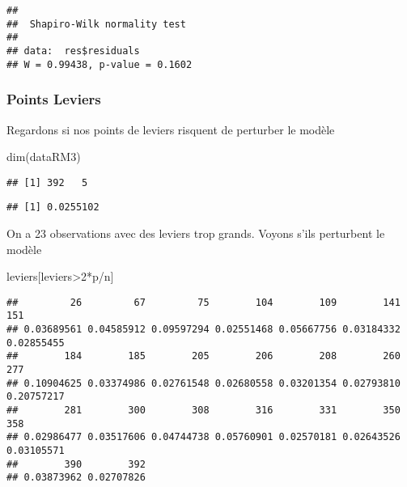 \documentclass[
]{article}
\newenvironment{Shaded}{\begin{snugshade}}{\end{snugshade}}
\newcommand{\DecValTok}[1]{\textcolor[rgb]{0.00,0.00,0.81}{#1}}
\newcommand{\FunctionTok}[1]{\textcolor[rgb]{0.00,0.00,0.00}{#1}}
\newcommand{\NormalTok}[1]{#1}
\newcommand{\OtherTok}[1]{\textcolor[rgb]{0.56,0.35,0.01}{#1}}
\newcommand{\SpecialCharTok}[1]{\textcolor[rgb]{0.00,0.00,0.00}{#1}}
\newcommand{\StringTok}[1]{\textcolor[rgb]{0.31,0.60,0.02}{#1}}
\begin{document}
\begin{verbatim}
## 
##  Shapiro-Wilk normality test
## 
## data:  res$residuals
## W = 0.99438, p-value = 0.1602
\end{verbatim}

\hypertarget{points-leviers}{%
\subsubsection{Points Leviers}\label{points-leviers}}

Regardons si nos points de leviers risquent de perturber le modèle

\begin{Shaded}
\begin{Highlighting}[]
\FunctionTok{dim}\NormalTok{(dataRM3)}
\end{Highlighting}
\end{Shaded}

\begin{verbatim}
## [1] 392   5
\end{verbatim}

\begin{Shaded}
\end{Shaded}

\begin{verbatim}
## [1] 0.0255102
\end{verbatim}

On a 23 observations avec des leviers trop grands. Voyons s'ils
perturbent le modèle

\begin{Shaded}
\begin{Highlighting}[]
\NormalTok{leviers[leviers}\SpecialCharTok{\textgreater{}}\DecValTok{2}\SpecialCharTok{*}\NormalTok{p}\SpecialCharTok{/}\NormalTok{n]}
\end{Highlighting}
\end{Shaded}

\begin{verbatim}
##         26         67         75        104        109        141        151 
## 0.03689561 0.04585912 0.09597294 0.02551468 0.05667756 0.03184332 0.02855455 
##        184        185        205        206        208        260        277 
## 0.10904625 0.03374986 0.02761548 0.02680558 0.03201354 0.02793810 0.20757217 
##        281        300        308        316        331        350        358 
## 0.02986477 0.03517606 0.04744738 0.05760901 0.02570181 0.02643526 0.03105571 
##        390        392 
## 0.03873962 0.02707826
\end{verbatim}
\end{document}
